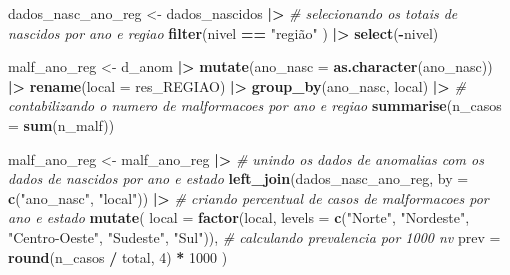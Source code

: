 \documentclass[
]{article}
\newenvironment{Shaded}{\begin{snugshade}}{\end{snugshade}}
\newcommand{\AttributeTok}[1]{\textcolor[rgb]{0.13,0.29,0.53}{#1}}
\newcommand{\CommentTok}[1]{\textcolor[rgb]{0.56,0.35,0.01}{\textit{#1}}}
\newcommand{\DecValTok}[1]{\textcolor[rgb]{0.00,0.00,0.81}{#1}}
\newcommand{\FunctionTok}[1]{\textcolor[rgb]{0.13,0.29,0.53}{\textbf{#1}}}
\newcommand{\NormalTok}[1]{#1}
\newcommand{\OtherTok}[1]{\textcolor[rgb]{0.56,0.35,0.01}{#1}}
\newcommand{\SpecialCharTok}[1]{\textcolor[rgb]{0.81,0.36,0.00}{\textbf{#1}}}
\newcommand{\StringTok}[1]{\textcolor[rgb]{0.31,0.60,0.02}{#1}}
\begin{document}
\begin{Shaded}
\begin{Highlighting}[]
\NormalTok{dados\_nasc\_ano\_reg }\OtherTok{\textless{}{-}}\NormalTok{ dados\_nascidos }\SpecialCharTok{|\textgreater{}} 
  \CommentTok{\# selecionando os totais de nascidos por ano e regiao}
  \FunctionTok{filter}\NormalTok{(nivel }\SpecialCharTok{==} \StringTok{"região"}\NormalTok{ ) }\SpecialCharTok{|\textgreater{}} 
  \FunctionTok{select}\NormalTok{(}\SpecialCharTok{{-}}\NormalTok{nivel)}

\NormalTok{malf\_ano\_reg }\OtherTok{\textless{}{-}}\NormalTok{ d\_anom }\SpecialCharTok{|\textgreater{}} 
  \FunctionTok{mutate}\NormalTok{(}\AttributeTok{ano\_nasc =} \FunctionTok{as.character}\NormalTok{(ano\_nasc)) }\SpecialCharTok{|\textgreater{}} 
  \FunctionTok{rename}\NormalTok{(}\AttributeTok{local =}\NormalTok{ res\_REGIAO) }\SpecialCharTok{|\textgreater{}} 
  \FunctionTok{group\_by}\NormalTok{(ano\_nasc, local) }\SpecialCharTok{|\textgreater{}} 
  \CommentTok{\# contabilizando o numero de malformacoes por ano e regiao}
  \FunctionTok{summarise}\NormalTok{(}\AttributeTok{n\_casos =} \FunctionTok{sum}\NormalTok{(n\_malf))}

\NormalTok{malf\_ano\_reg }\OtherTok{\textless{}{-}}\NormalTok{ malf\_ano\_reg }\SpecialCharTok{|\textgreater{}} 
  \CommentTok{\# unindo os dados de anomalias com os dados de nascidos por ano e estado}
  \FunctionTok{left\_join}\NormalTok{(dados\_nasc\_ano\_reg, }\AttributeTok{by =} \FunctionTok{c}\NormalTok{(}\StringTok{"ano\_nasc"}\NormalTok{, }\StringTok{"local"}\NormalTok{)) }\SpecialCharTok{|\textgreater{}} 
  \CommentTok{\# criando percentual de casos de malformacoes por ano e estado}
  \FunctionTok{mutate}\NormalTok{(}
    \AttributeTok{local =} \FunctionTok{factor}\NormalTok{(local, }\AttributeTok{levels =} \FunctionTok{c}\NormalTok{(}\StringTok{"Norte"}\NormalTok{, }\StringTok{"Nordeste"}\NormalTok{, }\StringTok{"Centro{-}Oeste"}\NormalTok{, }\StringTok{"Sudeste"}\NormalTok{, }\StringTok{"Sul"}\NormalTok{)),}
    \CommentTok{\# calculando prevalencia por 1000 nv}
    \AttributeTok{prev =} \FunctionTok{round}\NormalTok{(n\_casos }\SpecialCharTok{/}\NormalTok{ total, }\DecValTok{4}\NormalTok{) }\SpecialCharTok{*} \DecValTok{1000}
\NormalTok{  )}
\end{Highlighting}
\end{Shaded}
\end{document}
